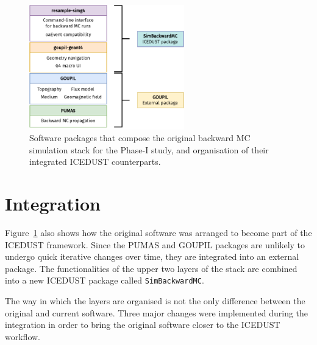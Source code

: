 \begin{figure}
    \centering
    \includegraphics[width=0.6\textwidth]{appendixA/integration_strategy.drawio.pdf}
    \caption{ Software packages that compose the original backward MC simulation
        stack for the Phase-I study, and organisation of their integrated
        ICEDUST counterparts.}
    \label{fig:pumas_integration_strategy}
\end{figure}

\section{Integration}

Figure~\ref{fig:pumas_integration_strategy} also shows how the original software
was arranged to become part of the ICEDUST framework. Since the PUMAS and GOUPIL
packages are unlikely to undergo quick iterative changes over time, they are integrated
into an external package. The functionalities of the upper two layers of the
stack are combined into a new ICEDUST package called \texttt{SimBackwardMC}.

The way in which the layers are organised is not the only difference between the
original and current software. Three major changes were implemented during the
integration in order to bring the original software closer to the ICEDUST
workflow.

